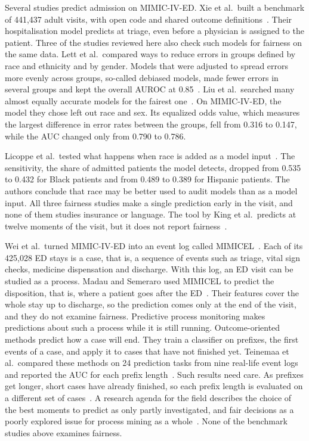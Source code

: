 Several studies predict admission on MIMIC-IV-ED. Xie et al.\ built a benchmark of 441,437 adult visits, with open code and shared outcome definitions~\cite{xie2022benchmarking}. Their hospitalisation model predicts at triage, even before a physician is assigned to the patient. Three of the studies reviewed here also check such models for fairness on the same data. Lett et al.\ compared ways to reduce errors in groups defined by race and ethnicity and by gender. Models that were adjusted to spread errors more evenly across groups, so-called debiased models, made fewer errors in several groups and kept the overall AUROC at 0.85~\cite{lett2025intersectional}. Liu et al.\ searched many almost equally accurate models for the fairest one~\cite{liu2024faim}. On MIMIC-IV-ED, the model they chose left out race and sex. Its equalized odds value, which measures the largest difference in error rates between the groups, fell from 0.316 to 0.147, while the AUC changed only from 0.790 to 0.786.

Licoppe et al.\ tested what happens when race is added as a model input~\cite{licoppe2026assessing}. The sensitivity, the share of admitted patients the model detects, dropped from 0.535 to 0.432 for Black patients and from 0.489 to 0.389 for Hispanic patients. The authors conclude that race may be better used to audit models than as a model input. All three fairness studies make a single prediction early in the visit, and none of them studies insurance or language. The tool by King et al.\ predicts at twelve moments of the visit, but it does not report fairness~\cite{king2022machine}.

Wei et al.\ turned MIMIC-IV-ED into an event log called MIMICEL~\cite{wei2023mimicel}. Each of its 425,028 ED stays is a case, that is, a sequence of events such as triage, vital sign checks, medicine dispensation and discharge. With this log, an ED visit can be studied as a process. Madau and Semeraro used MIMICEL to predict the disposition, that is, where a patient goes after the ED~\cite{madau2025process}. Their features cover the whole stay up to discharge, so the prediction comes only at the end of the visit, and they do not examine fairness. Predictive process monitoring makes predictions about such a process while it is still running. Outcome-oriented methods predict how a case will end. They train a classifier on prefixes, the first events of a case, and apply it to cases that have not finished yet. Teinemaa et al.\ compared these methods on 24 prediction tasks from nine real-life event logs and reported the AUC for each prefix length~\cite{teinemaa2019outcome}. Such results need care. As prefixes get longer, short cases have already finished, so each prefix length is evaluated on a different set of cases~\cite{teinemaa2018temporal}. A research agenda for the field describes the choice of the best moments to predict as only partly investigated, and fair decisions as a poorly explored issue for process mining as a whole~\cite{ceravolo2024predictive}. None of the benchmark studies above examines fairness.

